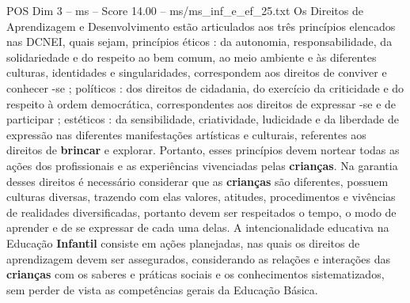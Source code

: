 \begin{textsample}{POS Dim 3 – ms – Score 14.00 – ms/ms\_inf\_e\_ef\_25.txt}
Os Direitos de Aprendizagem e Desenvolvimento estão articulados aos três princípios elencados nas DCNEI, quais sejam, princípios éticos : da autonomia, responsabilidade, da solidariedade e do respeito ao bem comum, ao meio ambiente e às diferentes culturas, identidades e singularidades, correspondem aos direitos de conviver e conhecer -se ; políticos : dos direitos de cidadania, do exercício da criticidade e do respeito à ordem democrática, correspondentes aos direitos de expressar -se e de participar ; estéticos : da sensibilidade, criatividade, ludicidade e da liberdade de expressão nas diferentes manifestações artísticas e culturais, referentes aos direitos de \textbf{brincar} e explorar.
Portanto, esses princípios devem nortear todas as ações dos profissionais e as experiências vivenciadas pelas \textbf{crianças}.
Na garantia desses direitos é necessário considerar que as \textbf{crianças} são diferentes, possuem culturas diversas, trazendo com elas valores, atitudes, procedimentos e vivências de realidades diversificadas, portanto devem ser respeitados o tempo, o modo de aprender e de se expressar de cada uma delas.
A intencionalidade educativa na Educação \textbf{Infantil} consiste em ações planejadas, nas quais os direitos de aprendizagem devem ser assegurados, considerando as relações e interações das \textbf{crianças} com os saberes e práticas sociais e os conhecimentos sistematizados, sem perder de vista as competências gerais da Educação Básica.

\end{textsample}
